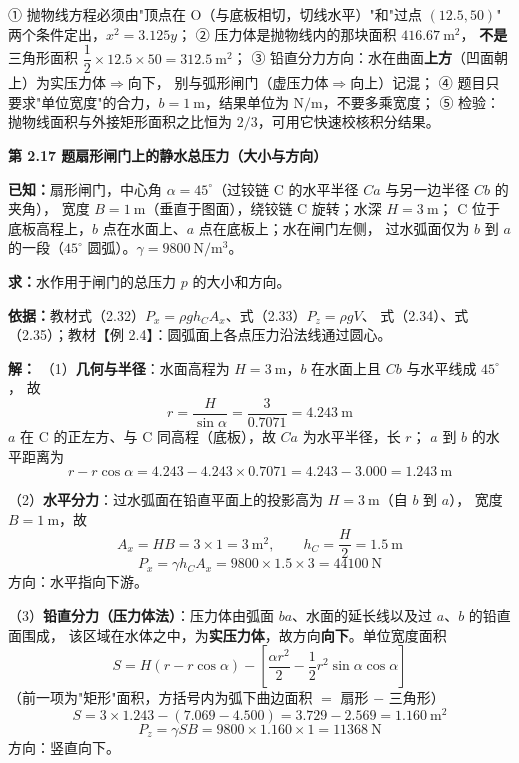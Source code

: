 \begin{yicuo}
① 抛物线方程必须由"顶点在 O（与底板相切，切线水平）"和"过点 $(12.5,50)$"
两个条件定出，$x^2=3.125y$；
② 压力体是抛物线内的那块面积 $416.67\ \mathrm{m^2}$，
\textbf{不是}三角形面积 $\dfrac{1}{2}\times12.5\times50=312.5\ \mathrm{m^2}$；
③ 铅直分力方向：水在曲面\textbf{上方}（凹面朝上）为实压力体$\Rightarrow$向下，
别与弧形闸门（虚压力体$\Rightarrow$向上）记混；
④ 题目只要求"单位宽度"的合力，$b=1\ \mathrm{m}$，结果单位为 $\mathrm{N/m}$，不要多乘宽度；
⑤ 检验：抛物线面积与外接矩形面积之比恒为 $2/3$，可用它快速校核积分结果。
\end{yicuo}

\noindent\textbf{第 2.17 题\quad 扇形闸门上的静水总压力（大小与方向）}

\begin{jie}
\textbf{已知：}扇形闸门，中心角 $\alpha=45^{\circ}$（过铰链 C 的水平半径 $Ca$ 与另一边半径 $Cb$ 的夹角），
宽度 $B=1\ \mathrm{m}$（垂直于图面），绕铰链 C 旋转；水深 $H=3\ \mathrm{m}$；
C 位于底板高程上，$b$ 点在水面上、$a$ 点在底板上；水在闸门左侧，
过水弧面仅为 $b$ 到 $a$ 的一段（$45^{\circ}$ 圆弧）。$\gamma=9800\ \mathrm{N/m^3}$。

\textbf{求：}水作用于闸门的总压力 $p$ 的大小和方向。

\textbf{依据：}教材式（2.32）$P_x=\rho gh_CA_x$、式（2.33）$P_z=\rho gV$、
式（2.34）、式（2.35）；教材【例 2.4】：圆弧面上各点压力沿法线通过圆心。

\textbf{解：}
（1）\textbf{几何与半径}：水面高程为 $H=3\ \mathrm{m}$，$b$ 在水面上且 $Cb$ 与水平线成 $45^{\circ}$，
故
\[ r=\frac{H}{\sin\alpha}=\frac{3}{0.7071}=4.243\ \mathrm{m} \]
$a$ 在 C 的正左方、与 C 同高程（底板），故 $Ca$ 为水平半径，长 $r$；
$a$ 到 $b$ 的水平距离为
\[ r-r\cos\alpha=4.243-4.243\times0.7071=4.243-3.000=1.243\ \mathrm{m} \]

（2）\textbf{水平分力}：过水弧面在铅直平面上的投影高为 $H=3\ \mathrm{m}$（自 $b$ 到 $a$），
宽度 $B=1\ \mathrm{m}$，故
\[ A_x=HB=3\times1=3\ \mathrm{m^2},\qquad h_C=\frac{H}{2}=1.5\ \mathrm{m} \]
\[ P_x=\gamma h_CA_x=9800\times1.5\times3=44100\ \mathrm{N} \]
方向：水平指向下游。

（3）\textbf{铅直分力（压力体法）}：压力体由弧面 $ba$、水面的延长线以及过 $a$、$b$ 的铅直面围成，
该区域在水体之中，为\textbf{实压力体}，故方向\textbf{向下}。单位宽度面积
\[ S=H\left(r-r\cos\alpha\right)-\left[\frac{\alpha r^2}{2}-\frac{1}{2}r^2\sin\alpha\cos\alpha\right] \]
（前一项为"矩形"面积，方括号内为弧下曲边面积 $=$ 扇形 $-$ 三角形）
\[ S=3\times1.243-\left(7.069-4.500\right)=3.729-2.569=1.160\ \mathrm{m^2} \]
\[ P_z=\gamma SB=9800\times1.160\times1=11368\ \mathrm{N} \]
方向：竖直向下。


\end{jie}
